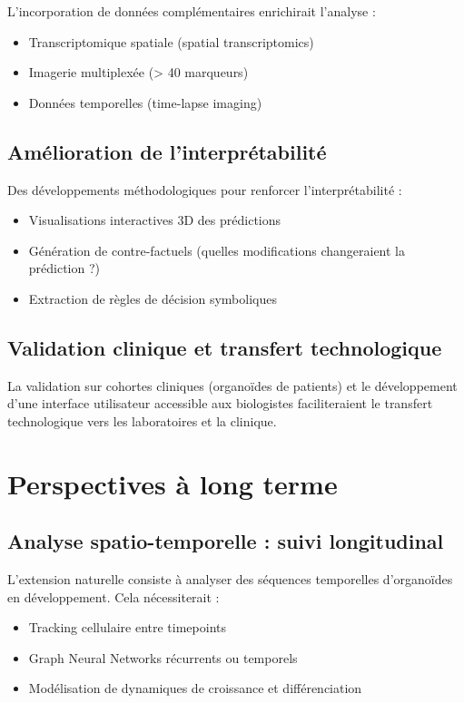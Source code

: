 L'incorporation de données complémentaires enrichirait l'analyse :
\begin{itemize}
    \item Transcriptomique spatiale (spatial transcriptomics)
    \item Imagerie multiplexée (> 40 marqueurs)
    \item Données temporelles (time-lapse imaging)
\end{itemize}

\subsection{Amélioration de l'interprétabilité}

Des développements méthodologiques pour renforcer l'interprétabilité :
\begin{itemize}
    \item Visualisations interactives 3D des prédictions
    \item Génération de contre-factuels (quelles modifications changeraient la prédiction ?)
    \item Extraction de règles de décision symboliques
\end{itemize}

\subsection{Validation clinique et transfert technologique}

La validation sur cohortes cliniques (organoïdes de patients) et le développement d'une interface utilisateur accessible aux biologistes faciliteraient le transfert technologique vers les laboratoires et la clinique.

\section{Perspectives à long terme}

\subsection{Analyse spatio-temporelle : suivi longitudinal}

L'extension naturelle consiste à analyser des séquences temporelles d'organoïdes en développement. Cela nécessiterait :
\begin{itemize}
    \item Tracking cellulaire entre timepoints
    \item Graph Neural Networks récurrents ou temporels
    \item Modélisation de dynamiques de croissance et différenciation
\end{itemize}

